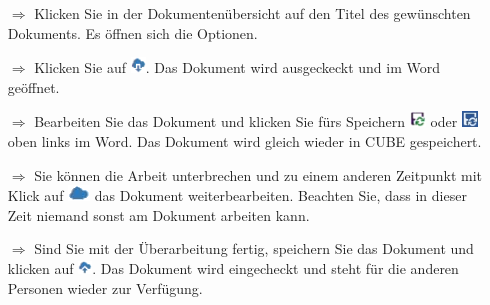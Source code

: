 \documentclass{article}
\begin{document}
\begin{multicols}{2}

\begin{tcolorbox}[colback=blue!5,colframe=blue!40!black,title=Bearbeiten von Dokumenten]
\begin{itemize}
  \item[$\Longrightarrow$] Klicken Sie in der Dokumentenübersicht auf den Titel des gewünschten Dokuments. Es öffnen sich die Optionen.
  \item[$\Longrightarrow$] Klicken Sie auf \includegraphics[height=12pt]{Icons/Auschecken.png}. Das Dokument wird ausgeckeckt und im Word geöffnet.
  \item[$\Longrightarrow$] Bearbeiten Sie das Dokument und klicken Sie fürs Speichern \includegraphics[height=12pt]{Icons/Sync2013.png} oder \includegraphics[height=12pt]{Icons/Sync2016.jpg} oben links im Word. Das Dokument wird gleich wieder in CUBE gespeichert.
  \item[$\Longrightarrow$] Sie können die Arbeit unterbrechen und zu einem anderen Zeitpunkt mit Klick auf \includegraphics[height=12pt]{Icons/Wolke_blauklein.png} das Dokument weiterbearbeiten. Beachten Sie, dass in dieser Zeit niemand sonst am Dokument arbeiten kann.
	\item[$\Longrightarrow$] Sind Sie mit der Überarbeitung fertig, speichern Sie das Dokument und klicken auf  \includegraphics[height=10pt]{Icons/Einchecken.png}. Das Dokument wird eingecheckt und steht für die anderen Personen wieder zur Verfügung.
\end{itemize}
\end{tcolorbox}



\end{multicols}
\end{document}
